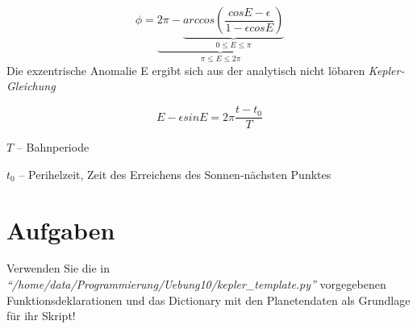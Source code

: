 \documentclass{scrartcl}	    %
\begin{document}
\[
\phi = \underbrace{2\pi - \underbrace{arccos(\frac{cos E-\epsilon}{1-\epsilon cos E})}_{0 \le E \le \pi}}_{\pi \le E \le 2\pi}
\]
Die exzentrische Anomalie E ergibt sich aus der analytisch nicht löbaren \emph{Kepler-Gleichung}

\[
E - \epsilon sin E = 2 \pi \frac{t - t_0}{T}
\]
\begin{description}
\item $T$ -- Bahnperiode
\item $t_0$ -- Perihelzeit, Zeit des Erreichens des Sonnen-nächsten Punktes
\end{description}

\section*{Aufgaben}
Verwenden Sie die in \emph{"`/home/data/Programmierung/Uebung10/kepler\_template.py"'} 
vorgegebenen Funktionsdeklarationen und das Dictionary mit den Planetendaten als Grundlage für ihr Skript!
\end{document}
